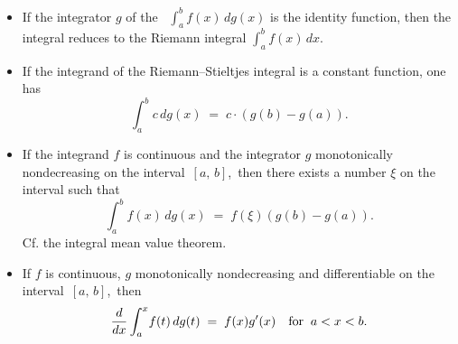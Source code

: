 \documentclass[12pt]{article}
\theoremstyle{definition}
\begin{document}
\begin{itemize}

\item If the integrator $g$ of the \, $\int_a^bf(x)\,dg(x)$ is the identity function, then the integral reduces to the Riemann integral $\int_a^bf(x)\,dx$.

\item If the integrand of the Riemann--Stieltjes integral is a constant function, one has
$$\int_a^b\!c\,dg(x) \;=\; c\!\cdot\!(g(b)\!-\!g(a)).$$

\item If the integrand $f$ is continuous and the integrator $g$ monotonically nondecreasing on the interval \,$[a,\,b]$,\, then there exists a number $\xi$ on the interval such that
$$\int_a^b\!f(x)\,dg(x) \;=\; f(\xi)(g(b)\!-\!g(a)).$$
Cf. the integral mean value theorem.

\item If $f$ is continuous, $g$ monotonically nondecreasing and differentiable on the interval \,$[a,\,b]$,\, then
$$\frac{d}{dx}\int_a^x\!f(t)\,dg(t) \;=\; f(x)g'(x) \quad \mbox{for\;\;} a < x < b.$$

\end{itemize}
\end{document}
